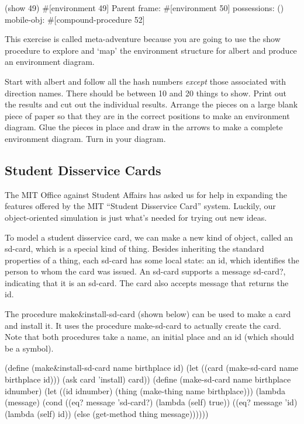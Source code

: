 \beginlisp
(show 49)
\#[environment 49]
Parent frame: \#[environment 50]
possessions:  ()
mobile-obj:   \#[compound-procedure 52]
\null
\endlisp

This exercise is called meta-adventure because you are going to use
the {\cf show} procedure to explore and `map' the environment
structure for {\cf albert} and produce an environment diagram.

Start with {\cf albert} and follow all the hash numbers {\em except}
those associated with direction names.  There should be between 10 and
20 things to show.  Print out the results and cut out the individual
results.  Arrange the pieces on a large blank piece of paper so that
they are in the correct positions to make an environment diagram.
Glue the pieces in place and draw in the arrows to make a complete
environment diagram.  Turn in your diagram.

\subsection{Student Disservice Cards}

The MIT Office against Student Affairs has asked us for help in
expanding the features offered by the MIT ``Student Disservice Card''
system.  Luckily, our object-oriented simulation is just what's needed
for trying out new ideas.

To model a student disservice card, we can make a new kind of object,
called an {\cf sd-card}, which is a special kind of thing.  Besides
inheriting the standard properties of a thing, each sd-card has some
local state: an {\cf id}, which identifies the person to whom the card
was issued.  An sd-card supports a message {\cf sd-card?}, indicating
that it is an sd-card.  The card also accepts message that returns the
{\cf id}.

The procedure {\cf make\&install-sd-card} (shown below) can be used to
make a card and install it.  It uses the procedure {\cf make-sd-card}
to actually create the card.  Note that both procedures take a name,
an initial place and an id (which should be a symbol).

\beginlisp
\null
(define (make\&install-sd-card name birthplace id)
  (let ((card (make-sd-card name birthplace id)))
    (ask card 'install)
    card))
\null
(define (make-sd-card name birthplace idnumber)
  (let ((id idnumber)
        (thing (make-thing name birthplace)))
    (lambda (message)
      (cond ((eq? message 'sd-card?) (lambda (self) true))
            ((eq? message 'id) (lambda (self) id))
            (else (get-method thing message))))))
\null
\endlisp

